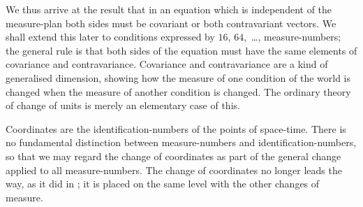 \documentclass[12pt]{book}
\begin{document}
We thus arrive at the result that in an equation which is independent
of the measure-plan both sides must be covariant or both contravariant
vectors. We shall extend this later to conditions expressed by $16$, $64$,~\dots,
measure-numbers; the general rule is that both sides of the equation must
have the same elements of covariance and contravariance. Covariance and
contravariance are a kind of generalised dimension, showing how the measure
of one condition of the world is changed when the measure of another condition
is changed. The ordinary theory of change of units is merely an
elementary case of this.

Coordinates are the identification-numbers of the points of space-time.
There is no fundamental distinction between measure-numbers and identification-numbers,
so that we may regard the change of coordinates as part of the
general change applied to all measure-numbers. The change of coordinates
no longer leads the way, as it did in ; it is placed on the same level with
the other changes of measure.
\end{document}

